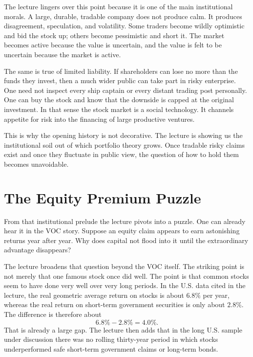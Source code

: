 The lecture lingers over this point because it is one of the main institutional morals. A large, durable, tradable company does not produce calm. It produces disagreement, speculation, and volatility. Some traders become wildly optimistic and bid the stock up; others become pessimistic and short it. The market becomes active because the value is uncertain, and the value is felt to be uncertain because the market is active.

The same is true of limited liability. If shareholders can lose no more than the funds they invest, then a much wider public can take part in risky enterprise. One need not inspect every ship captain or every distant trading post personally. One can buy the stock and know that the downside is capped at the original investment. In that sense the stock market is a social technology. It channels appetite for risk into the financing of large productive ventures.

This is why the opening history is not decorative. The lecture is showing us the institutional soil out of which portfolio theory grows. Once tradable risky claims exist and once they fluctuate in public view, the question of how to hold them becomes unavoidable.

\section{The Equity Premium Puzzle}

From that institutional prelude the lecture pivots into a puzzle. One can already hear it in the VOC story. Suppose an equity claim appears to earn astonishing returns year after year. Why does capital not flood into it until the extraordinary advantage disappears?

The lecture broadens that question beyond the VOC itself. The striking point is not merely that one famous stock once did well. The point is that common stocks seem to have done very well over very long periods. In the U.S. data cited in the lecture, the real geometric average return on stocks is about \(6.8\%\) per year, whereas the real return on short-term government securities is only about \(2.8\%\). The difference is therefore about
\begin{equation}
6.8\% - 2.8\% = 4.0\%.
\end{equation}
That is already a large gap. The lecture then adds that in the long U.S. sample under discussion there was no rolling thirty-year period in which stocks underperformed safe short-term government claims or long-term bonds.

